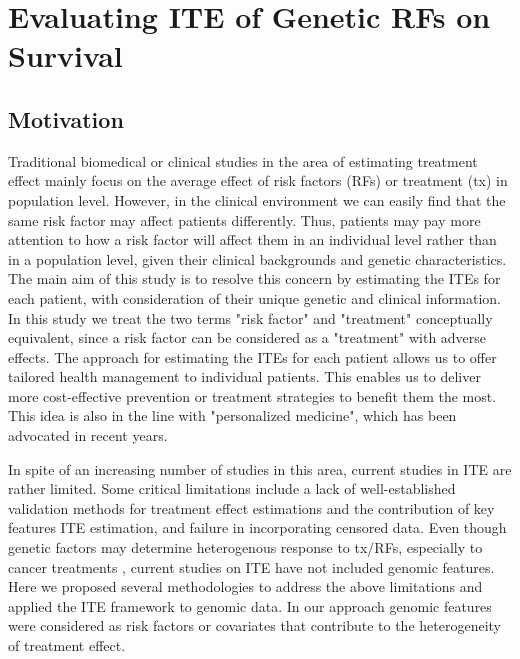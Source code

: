 \chapter{Evaluating ITE of Genetic RFs on Survival}
\label{chap:ite}

\section{Motivation}
\label{sec:ite_mot}
  Traditional biomedical or clinical studies in the area of estimating treatment effect mainly focus on the average effect of risk factors (RFs) or treatment (tx) in population level. However, in the clinical environment we can easily find that the same risk factor may affect patients differently. Thus, patients may pay more attention to how a risk factor will affect them in an individual level rather than in a population level, given their clinical backgrounds and genetic characteristics. The main aim of this study is to resolve this concern by estimating the ITEs for each patient, with consideration of their unique genetic and clinical information. In this study we treat the two terms "risk factor" and "treatment" conceptually equivalent, since a risk factor can be considered as a "treatment" with adverse effects. The approach for estimating the ITEs for each patient allows us to offer tailored health management to individual patients. This enables us to deliver more cost-effective prevention or treatment strategies to benefit them the most. This idea is also in the line with "personalized medicine", which has been advocated in recent years.

  In spite of an increasing number of studies in this area, current studies in ITE are rather limited. Some critical limitations include a lack of well-established validation methods for treatment effect estimations and the contribution of key features ITE estimation, and failure in incorporating censored data. Even though genetic factors may determine heterogenous response to tx/RFs, especially to cancer treatments \cite{fisher2013cancer}, current studies on ITE have not included genomic features. Here we proposed several methodologies to address the above limitations and applied the ITE framework to genomic data. In our approach genomic features were considered as risk factors or covariates that contribute to the heterogeneity of treatment effect.

